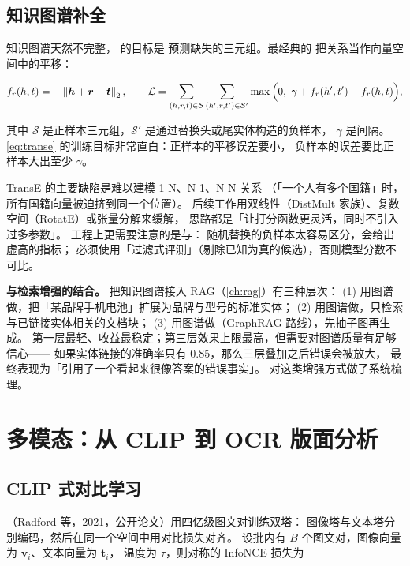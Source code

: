 \subsection{知识图谱补全}

知识图谱天然不完整， 的目标是
预测缺失的三元组。最经典的  把关系当作向量空间中的平移：

\begin{equation}
f_r(h, t) = -\left\lVert \bm{h} + \bm{r} - \bm{t} \right\rVert_{2},
\qquad
\mathcal{L} = \sum_{(h,r,t) \in \mathcal{S}} \sum_{(h',r,t') \in \mathcal{S}'}
\max\Big( 0,\ \gamma + f_r(h', t') - f_r(h, t) \Big),
\label{eq:transe}
\end{equation}

其中 $\mathcal{S}$ 是正样本三元组，$\mathcal{S}'$ 是通过替换头或尾实体构造的负样本，
$\gamma$ 是间隔。\cref{eq:transe} 的训练目标非常直白：正样本的平移误差要小，
负样本的误差要比正样本大出至少 $\gamma$。

TransE 的主要缺陷是难以建模 1-N、N-1、N-N 关系
（「一个人有多个国籍」时，所有国籍向量被迫挤到同一个位置）。
后续工作用双线性（DistMult 家族）、复数空间（RotatE）或张量分解来缓解，
思路都是「让打分函数更灵活，同时不引入过多参数」。
工程上更需要注意的是与：
随机替换的负样本太容易区分，会给出虚高的指标；
必须使用「过滤式评测」（剔除已知为真的候选），否则模型分数不可比。

\textbf{与检索增强的结合。} 把知识图谱接入 RAG（\cref{ch:rag}）有三种层次：
(1) 用图谱做，把「某品牌手机电池」扩展为品牌与型号的标准实体；
(2) 用图谱做，只检索与已链接实体相关的文档块；
(3) 用图谱做（GraphRAG 路线），先抽子图再生成。
第一层最轻、收益最稳定；第三层效果上限最高，但需要对图谱质量有足够信心——
如果实体链接的准确率只有 0.85，那么三层叠加之后错误会被放大，
最终表现为「引用了一个看起来很像答案的错误事实」。
\cite{gao2023ragsurvey} 对这类增强方式做了系统梳理。

\section{多模态：从 CLIP 到 OCR 版面分析}

\subsection{CLIP 式对比学习}

（Radford 等，2021，公开论文）用四亿级图文对训练双塔：
图像塔与文本塔分别编码，然后在同一个空间中用对比损失对齐。
设批内有 $B$ 个图文对，图像向量为 $\bm{v}_i$、文本向量为 $\bm{t}_i$，
温度为 $\tau$，则对称的 InfoNCE 损失为

